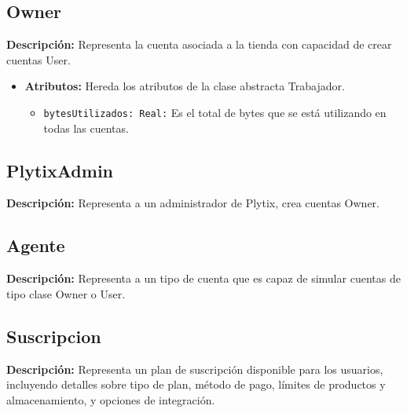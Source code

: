 \documentclass[12pt.a4paper]{article}
\begin{document}
\subsection{Owner}
     \textbf{Descripción:} Representa la cuenta asociada a la tienda con capacidad de crear cuentas User.
    \begin{itemize}
        \item {\textbf{Atributos:}} Hereda los atributos de la clase abstracta Trabajador.
        \begin{itemize}
            \item \texttt{bytesUtilizados: Real:} Es el total de bytes que se está utilizando en todas las cuentas.
        \end{itemize}
    \end{itemize}

\subsection{PlytixAdmin}
    \textbf{Descripción:} Representa a un administrador de Plytix, crea cuentas Owner.

\subsection{Agente}
    \textbf{Descripción:} Representa a un tipo de cuenta que es capaz de simular cuentas de tipo clase Owner o User.

\subsection{Suscripcion}
    \textbf{Descripción:} Representa un plan de suscripción disponible para los usuarios, incluyendo detalles sobre tipo de plan, método de pago, límites de productos y almacenamiento, y opciones de integración.
\end{document}

